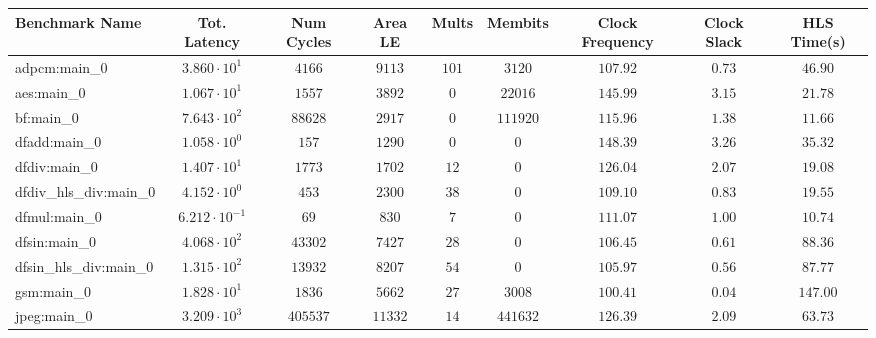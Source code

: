 \begin{tabular}{|l|c|c|c|c|c|c|c|c|}
\hline
Benchmark Name          & Tot. Latency            & Num Cycles & Area LE   & Mults   & Membits    & Clock Frequency & Clock Slack & HLS Time(s) \\
\hline
adpcm:main\_0           & $ 3.860 \cdot 10^{1}  $ & $ 4166   $ & $ 9113  $ & $ 101 $ & $ 3120   $ & $ 107.92      $ & $ 0.73    $ & $ 46.90   $ \\
aes:main\_0             & $ 1.067 \cdot 10^{1}  $ & $ 1557   $ & $ 3892  $ & $ 0   $ & $ 22016  $ & $ 145.99      $ & $ 3.15    $ & $ 21.78   $ \\
bf:main\_0              & $ 7.643 \cdot 10^{2}  $ & $ 88628  $ & $ 2917  $ & $ 0   $ & $ 111920 $ & $ 115.96      $ & $ 1.38    $ & $ 11.66   $ \\
dfadd:main\_0           & $ 1.058 \cdot 10^{0}  $ & $ 157    $ & $ 1290  $ & $ 0   $ & $ 0      $ & $ 148.39      $ & $ 3.26    $ & $ 35.32   $ \\
dfdiv:main\_0           & $ 1.407 \cdot 10^{1}  $ & $ 1773   $ & $ 1702  $ & $ 12  $ & $ 0      $ & $ 126.04      $ & $ 2.07    $ & $ 19.08   $ \\
dfdiv\_hls\_div:main\_0 & $ 4.152 \cdot 10^{0}  $ & $ 453    $ & $ 2300  $ & $ 38  $ & $ 0      $ & $ 109.10      $ & $ 0.83    $ & $ 19.55   $ \\
dfmul:main\_0           & $ 6.212 \cdot 10^{-1} $ & $ 69     $ & $ 830   $ & $ 7   $ & $ 0      $ & $ 111.07      $ & $ 1.00    $ & $ 10.74   $ \\
dfsin:main\_0           & $ 4.068 \cdot 10^{2}  $ & $ 43302  $ & $ 7427  $ & $ 28  $ & $ 0      $ & $ 106.45      $ & $ 0.61    $ & $ 88.36   $ \\
dfsin\_hls\_div:main\_0 & $ 1.315 \cdot 10^{2}  $ & $ 13932  $ & $ 8207  $ & $ 54  $ & $ 0      $ & $ 105.97      $ & $ 0.56    $ & $ 87.77   $ \\
gsm:main\_0             & $ 1.828 \cdot 10^{1}  $ & $ 1836   $ & $ 5662  $ & $ 27  $ & $ 3008   $ & $ 100.41      $ & $ 0.04    $ & $ 147.00  $ \\
jpeg:main\_0            & $ 3.209 \cdot 10^{3}  $ & $ 405537 $ & $ 11332 $ & $ 14  $ & $ 441632 $ & $ 126.39      $ & $ 2.09    $ & $ 63.73   $ \\

\end{tabular}
